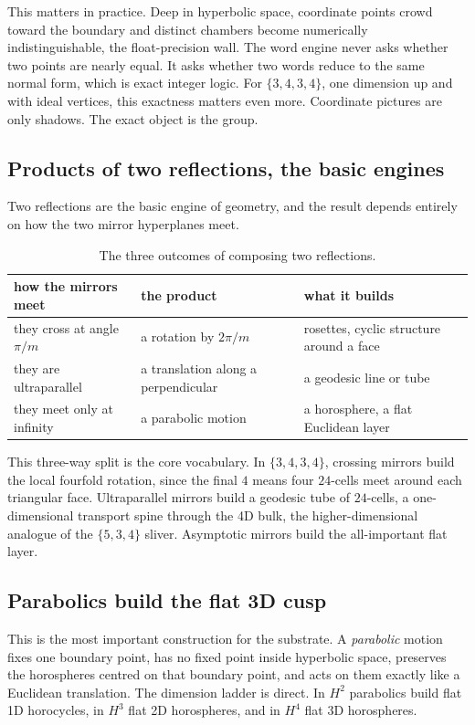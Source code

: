 This matters in practice. Deep in hyperbolic space, coordinate points crowd toward the boundary and distinct chambers become numerically indistinguishable, the float-precision wall. The word engine never asks whether two points are nearly equal. It asks whether two words reduce to the same normal form, which is exact integer logic. For $\{3,4,3,4\}$, one dimension up and with ideal vertices, this exactness matters even more. Coordinate pictures are only shadows. The exact object is the group.

\subsection{Products of two reflections, the basic engines}

Two reflections are the basic engine of geometry, and the result depends entirely on how the two mirror hyperplanes meet.

\begin{table}[ht]
\centering
\begin{tabular}{@{}lll@{}}
\toprule
how the mirrors meet & the product & what it builds \\
\midrule
they cross at angle $\pi/m$ & a rotation by $2\pi/m$ & rosettes, cyclic structure around a face \\
they are ultraparallel & a translation along a perpendicular & a geodesic line or tube \\
they meet only at infinity & a parabolic motion & a horosphere, a flat Euclidean layer \\
\bottomrule
\end{tabular}
\caption{The three outcomes of composing two reflections.}
\end{table}

This three-way split is the core vocabulary. In $\{3,4,3,4\}$, crossing mirrors build the local fourfold rotation, since the final $4$ means four $24$-cells meet around each triangular face. Ultraparallel mirrors build a geodesic tube of $24$-cells, a one-dimensional transport spine through the 4D bulk, the higher-dimensional analogue of the $\{5,3,4\}$ sliver. Asymptotic mirrors build the all-important flat layer.

\subsection{Parabolics build the flat 3D cusp}

This is the most important construction for the substrate. A \emph{parabolic} motion fixes one boundary point, has no fixed point inside hyperbolic space, preserves the horospheres centred on that boundary point, and acts on them exactly like a Euclidean translation. The dimension ladder is direct. In $H^2$ parabolics build flat 1D horocycles, in $H^3$ flat 2D horospheres, and in $H^4$ flat 3D horospheres.

